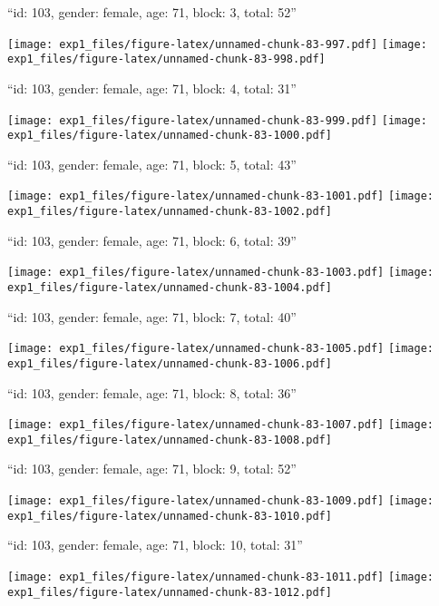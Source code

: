 \documentclass[11pt,,]{article}
\begin{document}
\newpage
[1] 

``id: 103, gender: female, age: 71, block: 3, total: 52''

\texttt{[image: exp1\_files/figure-latex/unnamed-chunk-83-997.pdf]}
\texttt{[image: exp1\_files/figure-latex/unnamed-chunk-83-998.pdf]}

\newpage
[1] 

``id: 103, gender: female, age: 71, block: 4, total: 31''

\texttt{[image: exp1\_files/figure-latex/unnamed-chunk-83-999.pdf]}
\texttt{[image: exp1\_files/figure-latex/unnamed-chunk-83-1000.pdf]}

\newpage
[1] 

``id: 103, gender: female, age: 71, block: 5, total: 43''

\texttt{[image: exp1\_files/figure-latex/unnamed-chunk-83-1001.pdf]}
\texttt{[image: exp1\_files/figure-latex/unnamed-chunk-83-1002.pdf]}

\newpage
[1] 

``id: 103, gender: female, age: 71, block: 6, total: 39''

\texttt{[image: exp1\_files/figure-latex/unnamed-chunk-83-1003.pdf]}
\texttt{[image: exp1\_files/figure-latex/unnamed-chunk-83-1004.pdf]}

\newpage
[1] 

``id: 103, gender: female, age: 71, block: 7, total: 40''

\texttt{[image: exp1\_files/figure-latex/unnamed-chunk-83-1005.pdf]}
\texttt{[image: exp1\_files/figure-latex/unnamed-chunk-83-1006.pdf]}

\newpage
[1] 

``id: 103, gender: female, age: 71, block: 8, total: 36''

\texttt{[image: exp1\_files/figure-latex/unnamed-chunk-83-1007.pdf]}
\texttt{[image: exp1\_files/figure-latex/unnamed-chunk-83-1008.pdf]}

\newpage
[1] 

``id: 103, gender: female, age: 71, block: 9, total: 52''

\texttt{[image: exp1\_files/figure-latex/unnamed-chunk-83-1009.pdf]}
\texttt{[image: exp1\_files/figure-latex/unnamed-chunk-83-1010.pdf]}

\newpage
[1] 

``id: 103, gender: female, age: 71, block: 10, total: 31''

\texttt{[image: exp1\_files/figure-latex/unnamed-chunk-83-1011.pdf]}
\texttt{[image: exp1\_files/figure-latex/unnamed-chunk-83-1012.pdf]}
\end{document}
